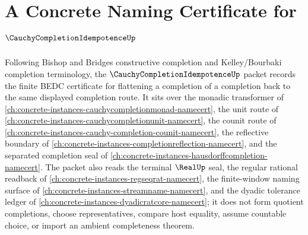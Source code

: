 \chapter{A Concrete Naming Certificate for $\CauchyCompletionIdempotenceUp$}
\label{ch:concrete-instances-cauchy-completion-idempotence-namecert}

Following Bishop and Bridges constructive completion and Kelley/Bourbaki completion terminology, the $\CauchyCompletionIdempotenceUp$ packet records the finite BEDC certificate for flattening a completion of a completion back to the same displayed completion route. It sits over the monadic transformer of \autoref{ch:concrete-instances-cauchycompletionmonad-namecert}, the unit route of \autoref{ch:concrete-instances-cauchycompletionunit-namecert}, the counit route of \autoref{ch:concrete-instances-cauchy-completion-counit-namecert}, the reflective boundary of \autoref{ch:concrete-instances-completionreflection-namecert}, and the separated completion seal of \autoref{ch:concrete-instances-hausdorffcompletion-namecert}. The packet also reads the terminal $\RealUp$ seal, the regular rational readback of \autoref{ch:concrete-instances-regseqrat-namecert}, the finite-window naming surface of \autoref{ch:concrete-instances-streamname-namecert}, and the dyadic tolerance ledger of \autoref{ch:concrete-instances-dyadicratcore-namecert}; it does not form quotient completions, choose representatives, compare host equality, assume countable choice, or import an ambient completeness theorem.

